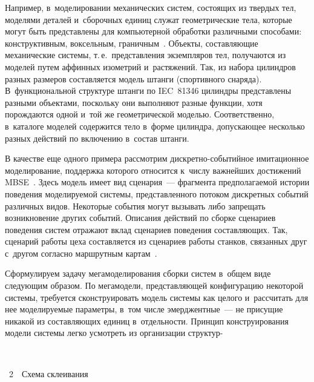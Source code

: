 \begin{multicols}{2}
   Например, в~моделировании механических сис\-тем, состоящих из твердых 
тел, моделями деталей и~сборочных единиц служат геометрические тела, 
которые могут быть представлены для компьютерной обработки различными 
способами: конструктивным, воксельным, граничным~\cite{10-kov}. Объекты, 
составляющие механические системы, т.\,е.\ представления экземпляров тел, 
получаются из моделей путем аффинных изометрий и~растяжений. Так, из 
набора цилиндров разных размеров составляется модель штанги (спортивного 
снаряда). В~функциональной структуре штанги по IEC~81346 цилиндры 
представлены разными объектами, поскольку они выполняют разные функции, 
хотя порождаются одной и~той же геометрической моделью. Соответственно, 
в~каталоге моделей содержится тело в~форме цилиндра, допускающее 
несколько разных действий по включению в~состав штанги.
   
   В качестве еще одного примера рассмотрим дис\-крет\-но-со\-бы\-тий\-ное 
имитационное моделирование, поддержка которого относится к~числу 
важнейших достижений MBSE~\cite{1-kov}. Здесь модель имеет вид 
сценария~--- фрагмента предполагаемой истории поведения моделируемой 
системы, пред\-став\-лен\-но\-го потоком дискретных событий различных видов. 
Некоторые события могут вызывать либо запрещать возникновение других 
событий. Описания действий по сборке сценариев поведения систем отражают 
вклад сценариев поведения составляющих. Так, сценарий работы цеха 
составляется из сценариев работы станков, связанных друг с~другом согласно 
маршрутным картам~\cite{11-kov}.
   
   Сформулируем задачу мегамоделирования сборки систем в~общем виде 
следующим образом. По мегамодели, представляющей конфигура\-цию 
некоторой системы, требуется сконструировать модель системы как целого 
и~рассчитать для нее моделируемые параметры, в~том числе эмерджентные~--- 
не присущие никакой из со\-став\-ля\-ющих единиц в~отдельности. Принцип 
конструирования модели системы легко усмотреть из организации 
структур-\linebreak\vspace*{-12pt}

\columnbreak

 { \begin{center}  %
 \vspace*{1pt}
\mbox{%
\epsfxsize=57.246mm
}


\vspace*{12pt}


\noindent
{{\figurename~2}\ \ \small{Схема склеивания}}
\end{center}
}


\end{multicols}
